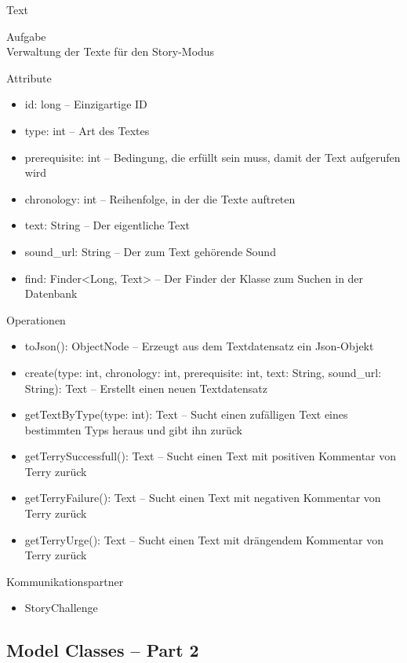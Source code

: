 \newpage
\begin{class}{70}{Text}
\item[Aufgabe]~\\
Verwaltung der Texte für den Story-Modus
\item[Attribute]~\\
\begin{itemize}
\item id: long -- Einzigartige ID
\item type: int -- Art des Textes
\item prerequisite: int -- Bedingung, die erfüllt sein muss, damit der Text aufgerufen wird
\item chronology: int -- Reihenfolge, in der die Texte auftreten
\item text: String -- Der eigentliche Text
\item sound\_url: String -- Der zum Text gehörende Sound
\item find: Finder<Long, Text> -- Der Finder der Klasse zum Suchen in der Datenbank
\end{itemize}
\item[Operationen]~\\
\begin{itemize}
\item toJson(): ObjectNode -- Erzeugt aus dem Textdatensatz ein Json-Objekt
\item create(type: int, chronology: int, prerequisite: int, text: String, sound\_url: String): Text -- Erstellt einen neuen Textdatensatz
\item getTextByType(type: int): Text -- Sucht einen zufälligen Text eines bestimmten Typs heraus und gibt ihn zurück
\item getTerrySuccessfull(): Text -- Sucht einen Text mit positiven Kommentar von Terry zurück
\item getTerryFailure(): Text -- Sucht einen Text mit negativen Kommentar von Terry zurück
\item getTerryUrge(): Text -- Sucht einen Text mit drängendem Kommentar von Terry zurück
\end{itemize}
\item[Kommunikationspartner]~\\
\begin{itemize}
\item StoryChallenge
\end{itemize}
\end{class}

\newpage
\subsection{Model Classes -- Part 2}
